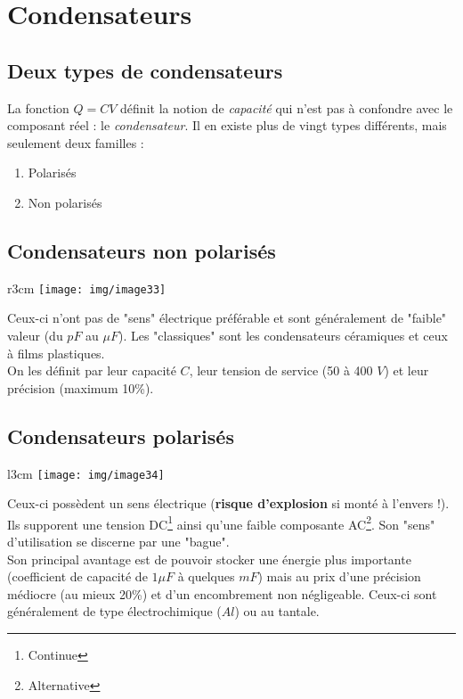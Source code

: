\section{Condensateurs}
\subsection{Deux types de condensateurs}
La fonction $Q = CV$ définit la notion de \textit{capacité} qui n'est pas à confondre avec le composant réel : le \textit{condensateur}. Il en existe plus de vingt types différents, mais seulement deux familles : 
\begin{enumerate}
	\item Polarisés
	\item Non polarisés
\end{enumerate}

\subsection{Condensateurs non polarisés}
\begin{wrapfigure}[6]{r}{3cm}
	\texttt{[image: img/image33]}
\end{wrapfigure}
Ceux-ci n'ont pas de "sens" électrique préférable et sont généralement de "faible" valeur (du $pF$ au $\mu F$). Les "classiques" sont les condensateurs céramiques et ceux à films plastiques.\\

On les définit par leur capacité $C$, leur tension de service (50 à 400 $V$) et leur précision (maximum 10\%).

\newpage
\subsection{Condensateurs polarisés}
\begin{wrapfigure}[8]{l}{3cm}
	\texttt{[image: img/image34]}
\end{wrapfigure}
Ceux-ci possèdent un sens électrique (\textbf{risque d'explosion} si monté à l'envers !). Ils supporent une tension DC\footnote{Continue} ainsi qu'une faible composante AC\footnote{Alternative}. Son "sens" d'utilisation se discerne par une "bague".\\

Son principal avantage est de pouvoir stocker une énergie plus importante (coefficient de capacité de $1\mu F$ à quelques $mF$) mais au prix d'une précision médiocre (au mieux 20\%) et d'un encombrement non négligeable. Ceux-ci sont généralement de type électrochimique ($Al$) ou au tantale.


